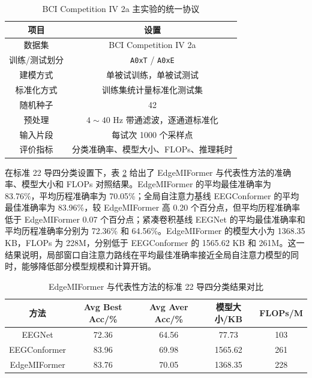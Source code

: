 \begin{table}[htbp]
    \centering
    \caption{BCI Competition IV 2a 主实验的统一协议}
    \label{tab:chap4_protocol}
    \begin{tabular}{cc}
        \hline
        项目 & 设置 \\
        \hline
        数据集 & BCI Competition IV 2a \\
        训练/测试划分 & \texttt{A0xT} / \texttt{A0xE} \\
        建模方式 & 单被试训练，单被试测试 \\
        标准化方式 & 训练集统计量标准化测试集 \\
        随机种子 & 42 \\
        预处理 & $4\sim40$ Hz 带通滤波，逐通道标准化 \\
        输入片段 & 每试次 1000 个采样点 \\
        评价指标 & 分类准确率、模型大小、FLOPs、推理耗时 \\
        \hline
    \end{tabular}
\end{table}

在标准 22 导四分类设置下，表 \ref{tab:chap4_benchmark_comparison} 给出了 EdgeMIFormer 与代表性方法的准确率、模型大小和 FLOPs 对照结果。EdgeMIFormer 的平均最佳准确率为 83.76\%，平均历程准确率为 70.05\%；全局自注意力基线 EEGConformer 的平均最佳准确率为 83.96\%，较 EdgeMIFormer 高 0.20 个百分点，但平均历程准确率低于 EdgeMIFormer 0.07 个百分点；紧凑卷积基线 EEGNet 的平均最佳准确率和平均历程准确率分别为 72.36\% 和 64.56\%。EdgeMIFormer 的模型大小为 1368.35 KB，FLOPs 为 228M，分别低于 EEGConformer 的 1565.62 KB 和 261M。这一结果说明，局部窗口自注意力路线在平均最佳准确率接近全局自注意力模型的同时，能够降低部分模型规模和计算开销。

\begin{table}[htbp]
    \centering
    \caption{EdgeMIFormer 与代表性方法的标准 22 导四分类结果对比}
    \label{tab:chap4_benchmark_comparison}
    \begin{tabular}{ccccc}
        \hline
        方法 & Avg Best Acc/\% & Avg Aver Acc/\% & 模型大小/KB & FLOPs/M \\
        \hline
        EEGNet & 72.36 & 64.56 & 77.73 & 103 \\
        EEGConformer & 83.96 & 69.98 & 1565.62 & 261 \\
        EdgeMIFormer & 83.76 & 70.05 & 1368.35 & 228 \\
        \hline
    \end{tabular}
\end{table}

